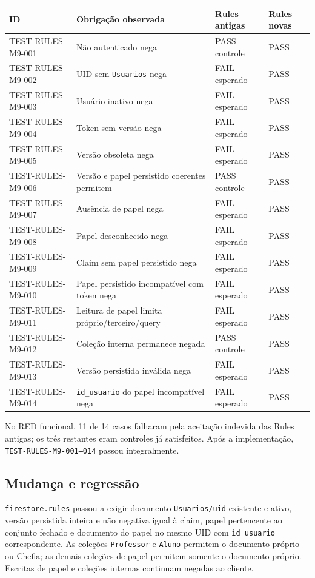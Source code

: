 \small
\begin{longtable}{@{}p{}p{}p{}p{}@{}}
\toprule
ID & Obrigação observada & Rules antigas & Rules novas \\
\midrule
\endhead
TEST-RULES-M9-001 & Não autenticado nega & PASS controle & PASS \\
TEST-RULES-M9-002 & UID sem \texttt{Usuarios} nega & FAIL esperado & PASS \\
TEST-RULES-M9-003 & Usuário inativo nega & FAIL esperado & PASS \\
TEST-RULES-M9-004 & Token sem versão nega & FAIL esperado & PASS \\
TEST-RULES-M9-005 & Versão obsoleta nega & FAIL esperado & PASS \\
TEST-RULES-M9-006 & Versão e papel persistido coerentes permitem & PASS controle & PASS \\
TEST-RULES-M9-007 & Ausência de papel nega & FAIL esperado & PASS \\
TEST-RULES-M9-008 & Papel desconhecido nega & FAIL esperado & PASS \\
TEST-RULES-M9-009 & Claim sem papel persistido nega & FAIL esperado & PASS \\
TEST-RULES-M9-010 & Papel persistido incompatível com token nega & FAIL esperado & PASS \\
TEST-RULES-M9-011 & Leitura de papel limita próprio/terceiro/query & FAIL esperado & PASS \\
TEST-RULES-M9-012 & Coleção interna permanece negada & PASS controle & PASS \\
TEST-RULES-M9-013 & Versão persistida inválida nega & FAIL esperado & PASS \\
TEST-RULES-M9-014 & \texttt{id\_usuario} do papel incompatível nega & FAIL esperado & PASS \\
\bottomrule
\end{longtable}
\normalsize

No RED funcional, 11 de 14 casos falharam pela aceitação indevida das Rules
antigas; os três restantes eram controles já satisfeitos. Após a implementação,
\texttt{TEST-RULES-M9-001--014} passou integralmente.

\subsection{Mudança e regressão}

\texttt{firestore.rules} passou a exigir documento
\nolinkurl{Usuarios/uid} existente e ativo, versão persistida inteira e não
negativa igual à claim, papel pertencente ao conjunto fechado e documento do
papel no mesmo UID com \texttt{id\_usuario} correspondente. As coleções
\texttt{Professor} e \texttt{Aluno} permitem o documento próprio ou Chefia; as
demais coleções de papel permitem somente o documento próprio. Escritas de
papel e coleções internas continuam negadas ao cliente.

